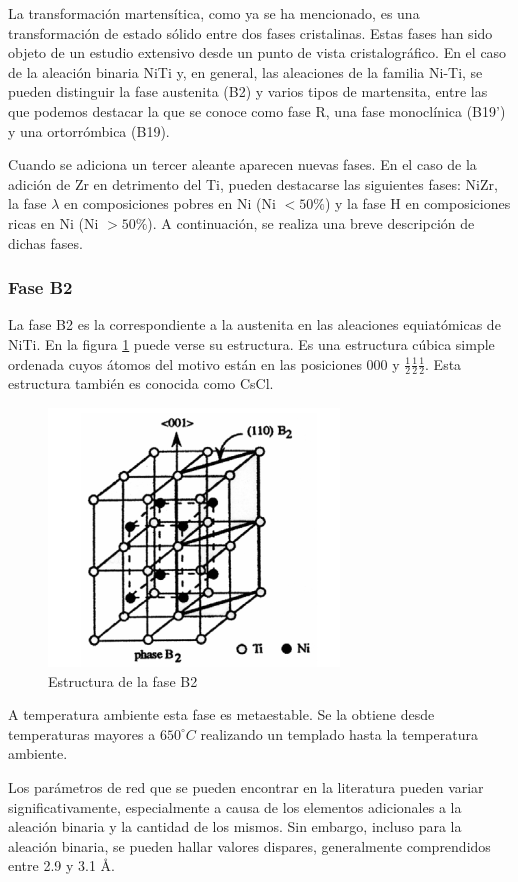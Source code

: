 \documentclass[12pt]{article}
\theoremstyle{definition}
\theoremstyle{remark}
\begin{document}
La transformación martensítica, como ya se ha mencionado, es una transformación de estado sólido entre dos fases cristalinas. Estas fases han sido objeto de un estudio extensivo desde un punto de vista cristalográfico. En el caso de la aleación binaria NiTi y, en general, las aleaciones de la familia Ni-Ti, se pueden distinguir la fase austenita (B2) y varios tipos de martensita, entre las que podemos destacar la que se conoce como fase R, una fase monoclínica (B19’) y una ortorrómbica (B19).

Cuando se adiciona un tercer aleante aparecen nuevas fases. En el caso de la adición de Zr en detrimento del Ti, pueden destacarse las siguientes fases: NiZr, la fase $\lambda$ en composiciones pobres en Ni (Ni $< 50\%$) y la fase H en composiciones ricas en Ni (Ni $> 50\%$). A continuación, se realiza una breve descripción de dichas fases.

\subsubsection{Fase B2}
La fase B2 es la correspondiente a la austenita en las aleaciones equiatómicas de NiTi. En la figura \ref{B2phase} puede verse su estructura. Es una estructura cúbica simple ordenada cuyos átomos del motivo están en las posiciones 000 y $\frac{1}{2}\frac{1}{2}\frac{1}{2}$. Esta estructura también es conocida como CsCl.
\begin{figure}[H]
	\centering
	\includegraphics[scale=0.5]{img/B2Phase.png}
	\caption{Estructura de la fase B2}
	\label{B2phase}
\end{figure}

A temperatura ambiente esta fase es metaestable. Se la obtiene desde temperaturas mayores a $650 ^\circ C$ realizando un templado hasta la temperatura ambiente.

Los parámetros de red que se pueden encontrar en la literatura pueden variar significativamente, especialmente a causa de los elementos adicionales a la aleación binaria y la cantidad de los mismos. Sin embargo, incluso para la aleación binaria, se pueden hallar valores dispares, generalmente comprendidos entre 2.9 y 3.1 \AA.
\end{document}
